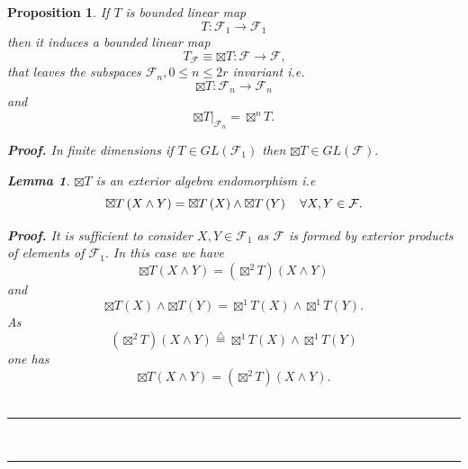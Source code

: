 \documentclass[aps, preprint]{revtex4}
\newtheorem{lemma}[theorem]{Lemma}
\newtheorem{proposition}[theorem]{Proposition}
\newenvironment{proof}[1][Proof]{\noindent\textbf{#1.} }{\ \rule{0.5em}{0.5em}}
\begin{document}
\begin{proposition}
If $T$ is bounded linear map
\begin{equation}T :\mathcal{F}_{1} \rightarrow \mathcal{F}_{1}
\end{equation}then it induces a bounded linear map
\begin{equation}T_{\mathcal{F}}  \equiv  \boxtimes T :\mathcal{F} \rightarrow \mathcal{F}\text{,}
\end{equation}that leaves the subspaces $\mathcal{F}_{n} ,0 \leq n \leq 2 r$ invariant i.e.
\begin{equation} \boxtimes T :\mathcal{F}_{n} \rightarrow \mathcal{F}_{n}
\end{equation}and
\begin{equation}\left . \boxtimes T\right \vert _{\mathcal{F}_{n}} = \boxtimes ^{n}T\text{.}
\end{equation}


\begin{proof}
In finite dimensions if $T \in G L \left (\mathcal{F}_{1}\right )$ then $ \boxtimes T \in G L \left (\mathcal{F}\right )\text{.}$ 


\begin{lemma}
$ \boxtimes T$ is an exterior algebra endomorphism i.e
\begin{equation} \boxtimes T \left (X \wedge Y\right ) = \boxtimes T \left (X\right )  \wedge  \boxtimes T \left (Y\right )\text{\quad } \forall X ,Y \in \mathcal{F}\text{.}
\end{equation}


\begin{proof}
It is sufficient to consider $X ,Y \in \mathcal{F}_{1}$ as $\mathcal{F}$ is formed by exterior products of elements of $\mathcal{F}_{1}\text{.}$ In this case we have
\begin{equation} \boxtimes T \left (X \wedge Y\right ) =\left ( \boxtimes ^{2}T\right ) \left (X \wedge Y\right )
\end{equation}and
\begin{equation} \boxtimes T \left (X\right )  \wedge  \boxtimes T \left (Y\right ) = \boxtimes ^{1}T \left (X\right ) \wedge  \boxtimes ^{1}T \left (Y\right )\text{.}
\end{equation}As
\begin{equation}\left ( \boxtimes ^{2}T\right ) \left (X \wedge Y\right )\overset{\triangle }{ =} \boxtimes ^{1}T \left (X\right ) \wedge  \boxtimes ^{1}T \left (Y\right )
\end{equation}one has
\begin{equation} \boxtimes T \left (X \wedge Y\right ) =\left ( \boxtimes ^{2}T\right ) \left (X \wedge Y\right )\text{.}
\end{equation}
\end{proof}



\end{lemma}
\end{proof}
\end{proposition}
\end{document}
